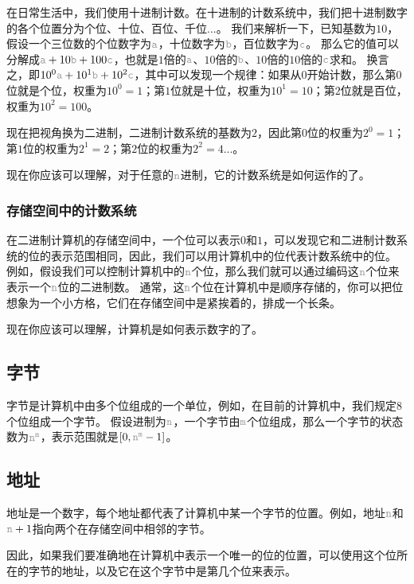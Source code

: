 \documentclass[12pt,a4paper,UTF8]{ctexart}
\newcommand{\var}[1]{\textcolor{lightgray}{\mathtt{#1}}}
\begin{document}
\qquad 在日常生活中，我们使用十进制计数。在十进制的计数系统中，我们把十进制数字的各个位置分为个位、十位、百位、千位...。
我们来解析一下，已知基数为$10$，假设一个三位数的个位数字为$\var{a}$，十位数字为$\var{b}$，百位数字为$\var{c}$。
那么它的值可以分解成$\var{a} + 10\var{b} + 100\var{c}$，也就是$1$倍的$\var{a}$、$10$倍的$\var{b}$、$10$倍的$10$倍的$\var{c}$求和。
换言之，即$10^0\var{a} + 10^1\var{b} + 10^2\var{c}$，其中可以发现一个规律：如果从$0$开始计数，那么第$0$位就是个位，权重为$10^0=1$；第$1$位就是十位，权重为$10^1=10$；第$2$位就是百位，权重为$10^2=100$。

\qquad 现在把视角换为二进制，二进制计数系统的基数为$2$，因此第$0$位的权重为$2^0=1$；第$1$位的权重为$2^1=2$；第$2$位的权重为$2^2=4$...。

\qquad 现在你应该可以理解，对于任意的$\var{n}$进制，它的计数系统是如何运作的了。

\subsubsection{存储空间中的计数系统}

\qquad 在二进制计算机的存储空间中，一个位可以表示$0$和$1$，可以发现它和二进制计数系统的位的表示范围相同，因此，我们可以用计算机中的位代表计数系统中的位。
例如，假设我们可以控制计算机中的$\var{n}$个位，那么我们就可以通过编码这$\var{n}$个位来表示一个$\var{n}$位的二进制数。
通常，这$\var{n}$个位在计算机中是顺序存储的，你可以把位想象为一个小方格，它们在存储空间中是紧挨着的，排成一个长条。

\qquad 现在你应该可以理解，计算机是如何表示数字的了。

\subsection{字节}

\qquad 字节是计算机中由多个位组成的一个单位，例如，在目前的计算机中，我们规定$8$个位组成一个字节。
假设进制为$\var{n}$，一个字节由$\var{m}$个位组成，那么一个字节的状态数为$\var{n}^{\var{m}}$，表示范围就是$[0, \var{n}^{\var{m}} - 1]$。

\subsection{地址}

\qquad 地址是一个数字，每个地址都代表了计算机中某一个字节的位置。例如，地址$\var{n}$和$\var{n}+1$指向两个在存储空间中相邻的字节。

\qquad 因此，如果我们要准确地在计算机中表示一个唯一的位的位置，可以使用这个位所在的字节的地址，以及它在这个字节中是第几个位来表示。
\end{document}
